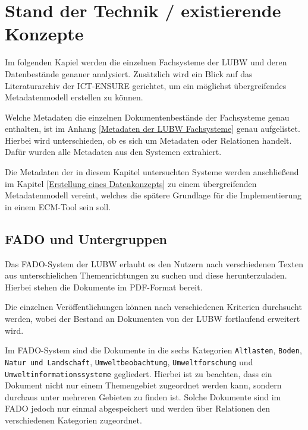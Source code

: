\section{Stand der Technik / existierende Konzepte} \label{Stand der Technik}
Im folgenden Kapiel werden die einzelnen Fachsysteme der \ac{LUBW} und deren Datenbest\"ande genauer analysiert. Zus\"atzlich wird ein Blick auf das Literaturarchiv der \ac{ICT-ENSURE} gerichtet, um ein m\"oglichst \"ubergreifendes Metadatenmodell erstellen zu k\"onnen. 

Welche Metadaten die einzelnen Dokumentenbest\"ande der Fachsysteme genau enthalten, ist im Anhang \ref{Metadaten der LUBW Fachsysteme} genau aufgelistet. Hierbei wird unterschieden, ob es sich um Metadaten oder Relationen handelt. Daf\"ur wurden alle Metadaten aus den Systemen extrahiert.


Die Metadaten der in diesem Kapitel untersuchten Systeme werden anschlie\ss{}end im Kapitel \ref{Erstellung eines Datenkonzepts} zu einem \"ubergreifenden Metadatenmodell vereint, welches die sp\"atere Grundlage f\"ur die Implementierung in einem \ac{ECM}-Tool sein soll.


\subsection{FADO und Untergruppen} \label{FADO}
Das \ac{FADO}-System der \ac{LUBW} erlaubt es den Nutzern nach verschiedenen Texten aus unterschielichen Themenrichtungen zu suchen und diese herunterzuladen. Hierbei stehen die Dokumente im PDF-Format bereit.

Die einzelnen Ver\"offentlichungen k\"onnen nach verschiedenen Kriterien durchsucht werden, wobei der Bestand an Dokumenten von der \ac{LUBW} fortlaufend erweitert wird.
\cite{LUBW_FADO}

Im \ac{FADO}-System sind die Dokumente in die sechs Kategorien \texttt{Altlasten}, \texttt{Boden}, \texttt{Natur und Landschaft}, \texttt{Umweltbeobachtung}, \texttt{Umweltforschung} und \texttt{Umweltinformationssysteme} gegliedert. Hierbei ist zu beachten, dass ein Dokument nicht nur einem Themengebiet zugeordnet werden kann, sondern durchaus unter mehreren Gebieten zu finden ist. Solche Dokumente sind im \ac{FADO} jedoch nur einmal abgespeichert und werden \"uber Relationen den verschiedenen Kategorien zugeordnet.

